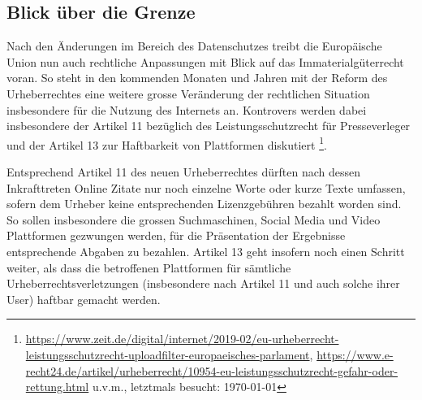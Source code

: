 \documentclass[a4paper,pointlessnumbers]{scrreprt}
\begin{document}
\subsection{Blick über die Grenze}
Nach den Änderungen im Bereich des Datenschutzes treibt die Europäische Union nun auch rechtliche Anpassungen mit Blick auf das Immaterialgüterrecht voran. So steht in den kommenden Monaten und Jahren mit der Reform des Urheberrechtes eine weitere grosse Veränderung der rechtlichen Situation insbesondere für die Nutzung des Internets an. Kontrovers werden dabei insbesondere der Artikel 11 bezüglich des Leistungsschutzrecht für Presseverleger und der Artikel 13 zur Haftbarkeit von Plattformen diskutiert \footnote{\href{https://www.zeit.de/digital/internet/2019-02/eu-urheberrecht-leistungsschutzrecht-uploadfilter-europaeisches-parlament}{https://www.zeit.de/digital/internet/2019-02/eu-urheberrecht-leistungsschutzrecht-uploadfilter-europaeisches-parlament}, \href{https://www.e-recht24.de/artikel/urheberrecht/10954-eu-leistungsschutzrecht-gefahr-oder-rettung.html}{https://www.e-recht24.de/artikel/urheberrecht/10954-eu-leistungsschutzrecht-gefahr-oder-rettung.html} u.v.m., letztmals besucht: \today}.

Entsprechend Artikel 11 des neuen Urheberrechtes dürften nach dessen Inkrafttreten Online Zitate nur noch einzelne Worte oder kurze Texte umfassen, sofern dem Urheber keine entsprechenden Lizenzgebühren bezahlt worden sind. So sollen insbesondere die grossen Suchmaschinen, Social Media und Video Plattformen gezwungen werden, für die Präsentation der Ergebnisse entsprechende Abgaben zu bezahlen. Artikel 13 geht insofern noch einen Schritt weiter, als dass die betroffenen Plattformen für sämtliche Urheberrechtsverletzungen (insbesondere nach Artikel 11 und auch solche ihrer User) haftbar gemacht werden.
\end{document}
